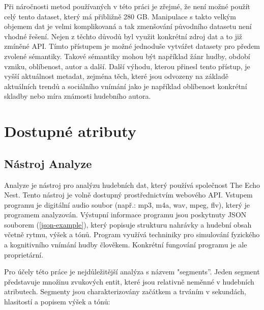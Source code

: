 \documentclass[thesis=M,czech]{FITthesis}[2012/06/26]
\begin{document}
	Při náročnosti metod používaných v této práci je zřejmé, že není možné použít celý tento dataset, který má přibližně 280 GB. Manipulace s takto velkým objemem dat je velmi komplikovaná a tak zmenšování původního datasetu není vhodné řešení. Nejen z těchto důvodů byl využit konkrétní zdroj dat a to již zmíněné API. Tímto přístupem je možné jednoduše vytvářet datasety pro předem zvolené sémantiky. Takové sémantiky mohou být například žánr hudby, období vzniku, oblíbenost, autor a další. Další výhodu, kterou přinesl tento přístup, je vyšší aktuálnost metadat, zejména těch, které jsou odvozeny na základě aktuálních trendů a sociálního vnímání jako je například oblíbenost konkrétní skladby nebo míra známosti hudebního autora.
	
\section{Dostupné atributy}
\subsection{Nástroj Analyze}

Analyze je nástroj pro analýzu hudebních dat, který používá společnost The Echo Nest. 
Tento nástroj je volně dostupný prostřednictvím webového API. Vstupem programu je digitální audio soubor (např.:  mp3, m4a, wav, mpeg, flv), který je programem analyzován. Výstupní informace programu jsou poskytnuty JSON souborem (\ref{json-example}), který popisuje strukturu nahrávky a hudební obsah včetně rytmu, výšek a tónů. Program využívá techniniky pro simulování fyzického a kognitivního vnímání hudby člověkem. Konkrétní fungování programu je ale proprietární. 

 Pro účely této práce je nejdůležitější analýza s názvem "segments”. Jeden segment představuje množinu zvukových entit, které jsou relativně neměnné v hudebních atributech. Segmenty jsou charakterizovány začátkem a trváním v sekundách, hlasitostí a popisem výšek a tónů:
\end{document}
